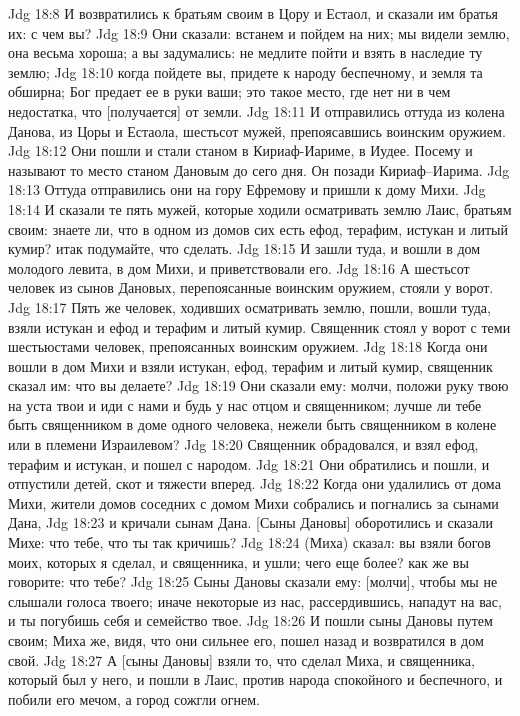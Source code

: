 Jdg 18:8  И возвратились к братьям своим в Цору и Естаол, и сказали им братья их: с чем вы?
Jdg 18:9  Они сказали: встанем и пойдем на них; мы видели землю, она весьма хороша; а вы задумались: не медлите пойти и взять в наследие ту землю;
Jdg 18:10  когда пойдете вы, придете к народу беспечному, и земля та обширна; Бог предает ее в руки ваши; это такое место, где нет ни в чем недостатка, что [получается] от земли.
Jdg 18:11  И отправились оттуда из колена Данова, из Цоры и Естаола, шестьсот мужей, препоясавшись воинским оружием.
Jdg 18:12  Они пошли и стали станом в Кириаф-Иариме, в Иудее. Посему и называют то место станом Дановым до сего дня. Он позади Кириаф--Иарима.
Jdg 18:13  Оттуда отправились они на гору Ефремову и пришли к дому Михи.
Jdg 18:14  И сказали те пять мужей, которые ходили осматривать землю Лаис, братьям своим: знаете ли, что в одном из домов сих есть ефод, терафим, истукан и литый кумир? итак подумайте, что сделать.
Jdg 18:15  И зашли туда, и вошли в дом молодого левита, в дом Михи, и приветствовали его.
Jdg 18:16  А шестьсот человек из сынов Дановых, перепоясанные воинским оружием, стояли у ворот.
Jdg 18:17  Пять же человек, ходивших осматривать землю, пошли, вошли туда, взяли истукан и ефод и терафим и литый кумир. Священник стоял у ворот с теми шестьюстами человек, препоясанных воинским оружием.
Jdg 18:18  Когда они вошли в дом Михи и взяли истукан, ефод, терафим и литый кумир, священник сказал им: что вы делаете?
Jdg 18:19  Они сказали ему: молчи, положи руку твою на уста твои и иди с нами и будь у нас отцом и священником; лучше ли тебе быть священником в доме одного человека, нежели быть священником в колене или в племени Израилевом?
Jdg 18:20  Священник обрадовался, и взял ефод, терафим и истукан, и пошел с народом.
Jdg 18:21  Они обратились и пошли, и отпустили детей, скот и тяжести вперед.
Jdg 18:22  Когда они удалились от дома Михи, жители домов соседних с домом Михи собрались и погнались за сынами Дана,
Jdg 18:23  и кричали сынам Дана. [Сыны Дановы] оборотились и сказали Михе: что тебе, что ты так кричишь?
Jdg 18:24  (Миха) сказал: вы взяли богов моих, которых я сделал, и священника, и ушли; чего еще более? как же вы говорите: что тебе?
Jdg 18:25  Сыны Дановы сказали ему: [молчи], чтобы мы не слышали голоса твоего; иначе некоторые из нас, рассердившись, нападут на вас, и ты погубишь себя и семейство твое.
Jdg 18:26  И пошли сыны Дановы путем своим; Миха же, видя, что они сильнее его, пошел назад и возвратился в дом свой.
Jdg 18:27  А [сыны Дановы] взяли то, что сделал Миха, и священника, который был у него, и пошли в Лаис, против народа спокойного и беспечного, и побили его мечом, а город сожгли огнем.
